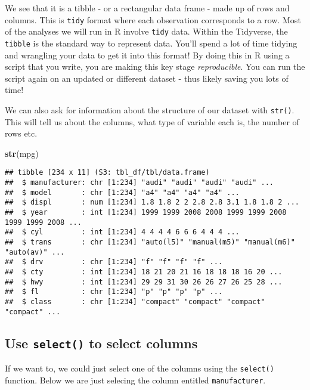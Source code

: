 \documentclass[
]{book}
\newenvironment{Shaded}{\begin{snugshade}}{\end{snugshade}}
\newcommand{\FunctionTok}[1]{\textcolor[rgb]{0.13,0.29,0.53}{\textbf{#1}}}
\newcommand{\NormalTok}[1]{#1}
\begin{document}
We see that it is a tibble - or a rectangular data frame - made up of rows and columns. This is \texttt{tidy} format where each observation corresponds to a row. Most of the analyses we will run in R involve \texttt{tidy} data. Within the Tidyverse, the \texttt{tibble} is the standard way to represent data. You'll spend a lot of time tidying and wrangling your data to get it into this format! By doing this in R using a script that you write, you are making this key stage \emph{reproducible}. You can run the script again on an updated or different dataset - thus likely saving you lots of time!

We can also ask for information about the structure of our dataset with \texttt{str()}. This will tell us about the columns, what type of variable each is, the number of rows etc.

\begin{Shaded}
\begin{Highlighting}[]
\FunctionTok{str}\NormalTok{(mpg)}
\end{Highlighting}
\end{Shaded}

\begin{verbatim}
## tibble [234 x 11] (S3: tbl_df/tbl/data.frame)
##  $ manufacturer: chr [1:234] "audi" "audi" "audi" "audi" ...
##  $ model       : chr [1:234] "a4" "a4" "a4" "a4" ...
##  $ displ       : num [1:234] 1.8 1.8 2 2 2.8 2.8 3.1 1.8 1.8 2 ...
##  $ year        : int [1:234] 1999 1999 2008 2008 1999 1999 2008 1999 1999 2008 ...
##  $ cyl         : int [1:234] 4 4 4 4 6 6 6 4 4 4 ...
##  $ trans       : chr [1:234] "auto(l5)" "manual(m5)" "manual(m6)" "auto(av)" ...
##  $ drv         : chr [1:234] "f" "f" "f" "f" ...
##  $ cty         : int [1:234] 18 21 20 21 16 18 18 18 16 20 ...
##  $ hwy         : int [1:234] 29 29 31 30 26 26 27 26 25 28 ...
##  $ fl          : chr [1:234] "p" "p" "p" "p" ...
##  $ class       : chr [1:234] "compact" "compact" "compact" "compact" ...
\end{verbatim}

\hypertarget{use-select-to-select-columns}{%
\subsection{\texorpdfstring{Use \texttt{select()} to select columns}{Use select() to select columns}}\label{use-select-to-select-columns}}

If we want to, we could just select one of the columns using the \texttt{select()} function. Below we are just selecing the column entitled \texttt{manufacturer}.
\end{document}
